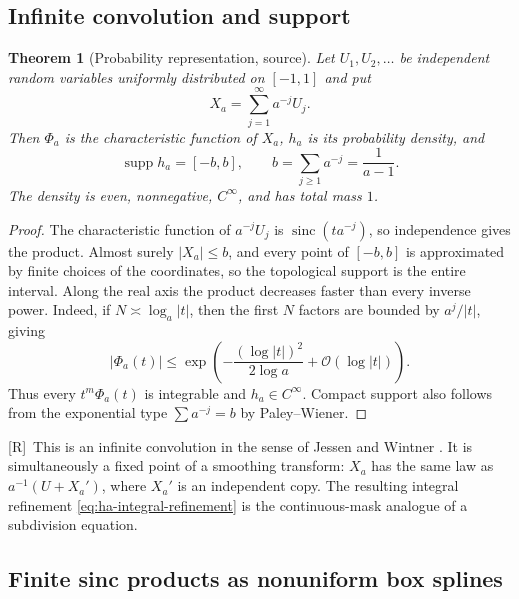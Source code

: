 \documentclass[11pt,oneside]{article}
\newtheorem{theorem}{Theorem}[section]
\theoremstyle{definition}
\theoremstyle{remark}
\newcommand{\sinc}{\operatorname{sinc}}
\newcommand{\bigO}{\mathcal O}
\newcommand{\supp}{\operatorname{supp}}
\newcommand{\Rmark}{\textcolor{sourceblue}{\textsf{[R]}}}
\begin{document}
\subsection{Infinite convolution and support}

\begin{theorem}[Probability representation, source]
\label{thm:probability-ha}
Let $U_1,U_2,\ldots$ be independent random variables uniformly distributed on $[-1,1]$ and
put
\begin{equation}
 X_a=\sum_{j=1}^{\infty}a^{-j}U_j.
 \tag{S3.26}
 \label{eq:Xa}
\end{equation}
Then $\Phi_a$ is the characteristic function of $X_a$, $h_a$ is its probability density,
and
\begin{equation}
 \supp h_a=[-b,b],\qquad b=\sum_{j\ge1}a^{-j}=\frac1{a-1}.
 \tag{S3.27}
 \label{eq:ha-support}
\end{equation}
The density is even, nonnegative, $C^\infty$, and has total mass $1$.
\end{theorem}

\begin{proof}
The characteristic function of $a^{-j}U_j$ is $\sinc(ta^{-j})$, so independence gives the
product.  Almost surely $|X_a|\le b$, and every point of $[-b,b]$ is approximated by finite
choices of the coordinates, so the topological support is the entire interval.  Along the
real axis the product decreases faster than every inverse power.  Indeed, if
$N\asymp\log_a|t|$, then the first $N$ factors are bounded by $a^j/|t|$, giving
\begin{equation}
 |\Phi_a(t)|\le
 \exp\!\left(-\frac{(\log|t|)^2}{2\log a}+\bigO(\log|t|)\right).
 \label{eq:lognormal-fourier-bound}
\end{equation}
Thus every $t^m\Phi_a(t)$ is integrable and $h_a\in C^\infty$.  Compact support also follows
from the exponential type $\sum a^{-j}=b$ by Paley--Wiener.
\end{proof}

\Rmark\ This is an infinite convolution in the sense of Jessen and Wintner
\cite{jessen1935}.  It is simultaneously a fixed point of a smoothing transform: $X_a$ has
the same law as $a^{-1}(U+X_a')$, where $X_a'$ is an independent copy.  The resulting
integral refinement \eqref{eq:ha-integral-refinement} is the continuous-mask analogue of a
subdivision equation.

\subsection{Finite sinc products as nonuniform box splines}
\end{document}
